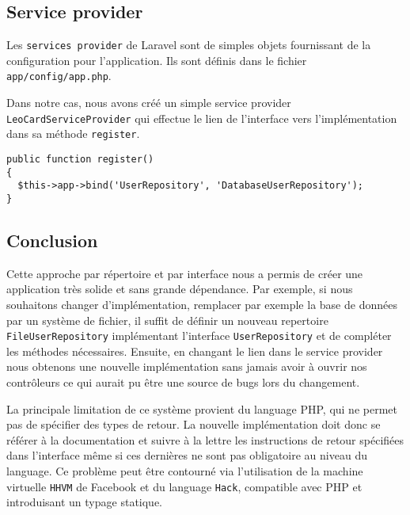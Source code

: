 \subsection{Service provider}

Les \verb|services provider| de Laravel sont de simples objets fournissant de la configuration pour l'application. Ils sont définis dans le fichier \verb|app/config/app.php|.

Dans notre cas, nous avons créé un simple service provider \verb|LeoCardServiceProvider| qui effectue le lien de l'interface vers l'implémentation dans sa méthode \verb|register|.
\begin{verbatim}
public function register()
{
  $this->app->bind('UserRepository', 'DatabaseUserRepository');
}
\end{verbatim}

\subsection{Conclusion}

Cette approche par répertoire et par interface nous a permis de créer une application très solide et sans grande dépendance. Par exemple, si nous souhaitons changer d'implémentation, remplacer par exemple la base de données par un système de fichier, il suffit de définir un nouveau repertoire \verb|FileUserRepository| implémentant l'interface \verb|UserRepository| et de compléter les méthodes nécessaires. Ensuite, en changant le lien dans le service provider nous obtenons une nouvelle implémentation sans jamais avoir à ouvrir nos contrôleurs ce qui aurait pu être une source de bugs lors du changement.

La principale limitation de ce système provient du language PHP, qui ne permet pas de spécifier des types de retour. La nouvelle implémentation doit donc se référer à la documentation et suivre à la lettre les instructions de retour spécifiées dans l'interface même si ces dernières ne sont pas obligatoire au niveau du language. Ce problème peut être contourné via l'utilisation de la machine virtuelle \verb|HHVM| de Facebook et du language \verb|Hack|, compatible avec PHP et introduisant un typage statique.
